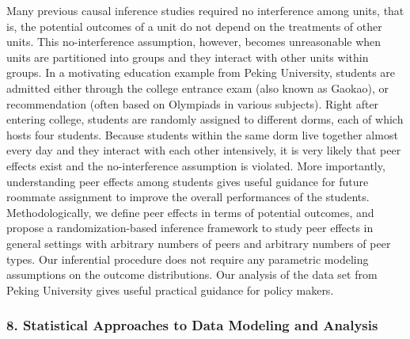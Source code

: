 \begin{itemize}
Many previous causal inference studies required no interference among units, that is, the potential outcomes of a unit do not depend on the treatments of other units. This no-interference assumption, however, becomes unreasonable when units are partitioned into groups and they interact with other units  within groups. In a motivating education example from Peking University, students are admitted either through the college entrance exam (also known as Gaokao), or recommendation (often based on Olympiads in various subjects). Right after entering college, students are randomly assigned to different dorms, each of which hosts four students. Because students within the same dorm live together almost every day and they interact with each other intensively, it is very likely that peer effects exist and the no-interference assumption is violated. More importantly, understanding peer effects among students gives useful guidance for future roommate assignment to improve the overall performances of the students. Methodologically, we define peer effects in terms of potential outcomes, and propose a randomization-based inference framework to study peer effects in general settings with arbitrary numbers of peers and arbitrary numbers of peer types. Our inferential procedure does not require any parametric modeling assumptions on the outcome distributions. Our analysis of the data set from Peking University gives useful practical guidance for policy makers.

\end{itemize}

\subsubsection*{8. Statistical Approaches to Data Modeling and Analysis}

